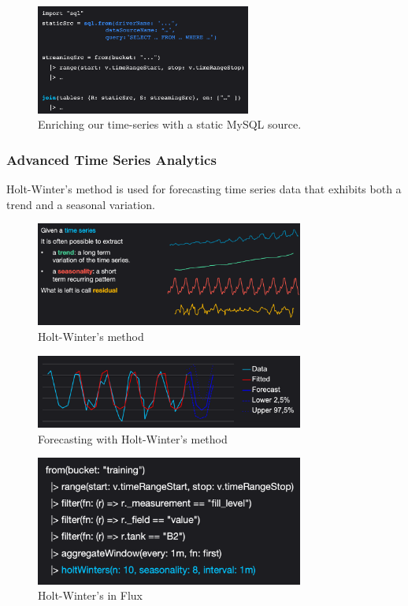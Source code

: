 \documentclass[10pt,a4paper]{article}
\begin{document}
 \begin{figure}[ht!]
 \hfill \includegraphics[width=200pt]{images/flux-timeseries-enrich-ex}
 \hspace*{\fill}
 \caption{Enriching our time-series with a static MySQL source.}
 \end{figure} 
 
\pagebreak 
 
 \subsubsection{Advanced Time Series Analytics}
 Holt-Winter's method is used for forecasting time series data that exhibits both a trend and a seasonal variation.
  \begin{figure}[ht!]
 \hfill \includegraphics[width=250pt]{images/flux-holt-winter}
 \hspace*{\fill}
 \caption{Holt-Winter's method}
 \end{figure} 
 
   \begin{figure}[ht!]
 \hfill \includegraphics[width=250pt]{images/flux-forecasting}
 \hspace*{\fill}
 \caption{Forecasting with Holt-Winter's method}
 \end{figure} 
 
    \begin{figure}[ht!]
 \hfill \includegraphics[width=250pt]{images/flux-holt-winter-ex}
 \hspace*{\fill}
 \caption{Holt-Winter's in Flux}
 \end{figure} 
 
\end{document}
